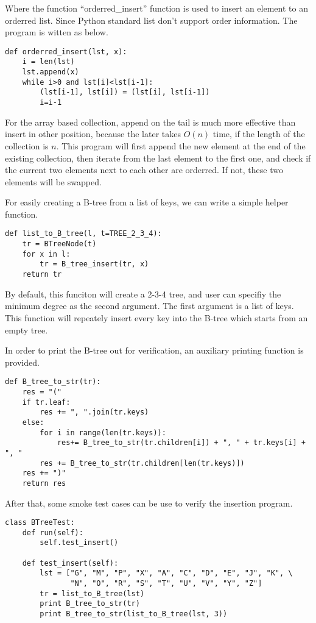 \documentclass{article}
\begin{document}
Where the function ``orderred\_insert'' function is used to insert an element
to an orderred list. Since Python standard list don't support order information.
The program is witten as below.

\begin{lstlisting}
def orderred_insert(lst, x):
    i = len(lst)
    lst.append(x)
    while i>0 and lst[i]<lst[i-1]:
        (lst[i-1], lst[i]) = (lst[i], lst[i-1])
        i=i-1
\end{lstlisting}

For the array based collection, append on the tail is much more effective than
insert in other position, because the later takes $O(n)$ time, if the length
of the collection is $n$. This program will first append the new element at
the end of the existing collection, then iterate from the last element to
the first one, and check if the current two elements next to each other
are orderred. If not, these two elements will be swapped. 

For easily creating a B-tree from a list of keys, we can write a simple helper
function.

\begin{lstlisting}
def list_to_B_tree(l, t=TREE_2_3_4):
    tr = BTreeNode(t)
    for x in l:
        tr = B_tree_insert(tr, x)
    return tr
\end{lstlisting}

By default, this funciton will create a 2-3-4 tree, and user can specifiy the
minimum degree as the second argument. The first argument is a list of keys.
This function will repeately insert every key into the B-tree which starts
from an empty tree.

In order to print the B-tree out for verification, an auxiliary printing
function is provided.

\begin{lstlisting}
def B_tree_to_str(tr):
    res = "("
    if tr.leaf:
        res += ", ".join(tr.keys)
    else:
        for i in range(len(tr.keys)):
            res+= B_tree_to_str(tr.children[i]) + ", " + tr.keys[i] + ", "
        res += B_tree_to_str(tr.children[len(tr.keys)])
    res += ")"
    return res
\end{lstlisting}

After that, some smoke test cases can be use to verify the insertion 
program.

\begin{lstlisting}
class BTreeTest:
    def run(self):
        self.test_insert()

    def test_insert(self):
        lst = ["G", "M", "P", "X", "A", "C", "D", "E", "J", "K", \
               "N", "O", "R", "S", "T", "U", "V", "Y", "Z"]
        tr = list_to_B_tree(lst)
        print B_tree_to_str(tr)
        print B_tree_to_str(list_to_B_tree(lst, 3))
\end{lstlisting}
\end{document}

